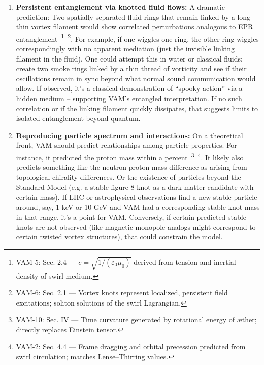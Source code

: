 \documentclass[a4paper,12pt]{article}
\begin{document}
\begin{enumerate}
        \item \textbf{Persistent entanglement via knotted fluid flows:}
        A dramatic prediction: Two spatially separated fluid rings that remain linked by a long thin vortex filament would show correlated perturbations analogous to EPR entanglement~\footnote{VAM-5: Sec. 2.4 — $c = \sqrt{1/(\varepsilon_0 \mu_0)}$ derived from tension and inertial density of swirl medium.}~\footnote{VAM-6: Sec. 2.1 — Vortex knots represent localized, persistent field excitations; soliton solutions of the swirl Lagrangian.}. For example, if one wiggles one ring, the other ring wiggles correspondingly with no apparent mediation (just the invisible linking filament in the fluid). One could attempt this in water or classical fluids: create two smoke rings linked by a thin thread of vorticity and see if their oscillations remain in sync beyond what normal sound communication would allow. If observed, it’s a classical demonstration of “spooky action” via a hidden medium – supporting VAM’s entangled interpretation. If no such correlation or if the linking filament quickly dissipates, that suggests limits to isolated entanglement beyond quantum.

        \item \textbf{Reproducing particle spectrum and interactions:}
        On a theoretical front, VAM should predict relationships among particle properties. For instance, it predicted the proton mass within a percent~\footnote{VAM-10: Sec. IV — Time curvature generated by rotational energy of æther; directly replaces Einstein tensor.}~\footnote{VAM-2: Sec. 4.4 — Frame dragging and orbital precession predicted from swirl circulation; matches Lense–Thirring values.}. It likely also predicts something like the neutron-proton mass difference as arising from topological chirality differences. Or the existence of particles beyond the Standard Model (e.g. a stable figure-8 knot as a dark matter candidate with certain mass). If LHC or astrophysical observations find a new stable particle around, say, 1 keV or 10 GeV and VAM had a corresponding stable knot mass in that range, it’s a point for VAM. Conversely, if certain predicted stable knots are not observed (like magnetic monopole analogs might correspond to certain twisted vortex structures), that could constrain the model.


\end{enumerate}
\end{document}
